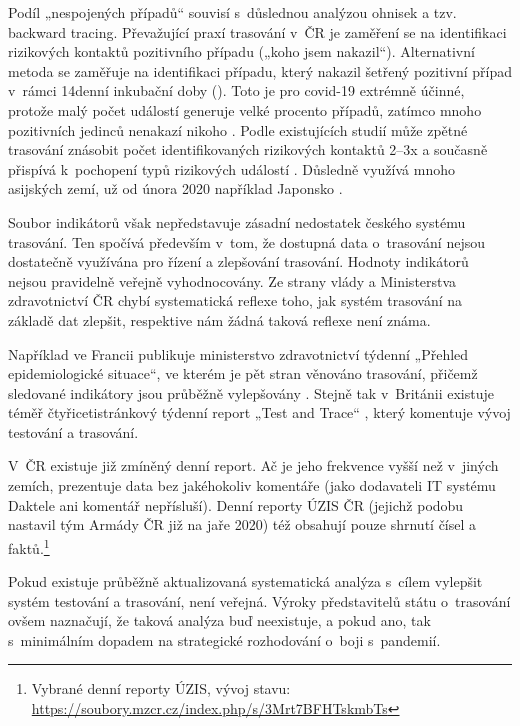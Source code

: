 Podíl „nespojených případů“ souvisí s~důslednou analýzou ohnisek a tzv. back\-ward tracing. Převažující praxí trasování v~ČR je zaměření se na identifikaci rizikových kontaktů pozitivního případu („koho jsem nakazil“). Alternativní metoda se zaměřuje na identifikaci případu, který nakazil šetřený pozitivní případ v~rámci 14denní inkubační doby (). Toto  je pro covid-19 extrémně účinné, protože malý počet  událostí generuje velké procento případů, zatímco mnoho pozitivních jedinců nenakazí nikoho \cite{tr_adam_clustering_2020}. Podle existujících studií může zpětné trasování znásobit počet identifikovaných rizikových kontaktů 2--3x a současně přispívá k~pochopení typů rizikových událostí \cite{tr_Endo}. Důsledně  využívá mnoho asijských zemí, už od února 2020 například Japonsko \cite{tr_Loh}.

Soubor indikátorů však nepředstavuje zásadní nedostatek českého systému trasování. Ten spočívá především v~tom, že dostupná data o~trasování nejsou dostatečně využívána pro řízení a zlepšování trasování. Hodnoty indikátorů nejsou pravidelně veřejně vyhodnocovány. Ze strany vlády a Ministerstva zdravotnictví ČR chybí systematická reflexe toho, jak systém trasování na základě dat zlepšit, respektive nám žádná taková reflexe není známa.

Například ve Francii publikuje ministerstvo zdravotnictví týdenní „Přehled epidemiologické situace“, ve kterém je pět stran věnováno trasování, přičemž sledované indikátory jsou průběžně vylepšovány \cite{tr_france}. Stejně tak v~Británii existuje téměř čtyřicetistránkový týdenní report „Test and Trace“ \cite{tr_gov_uk}, který komentuje vývoj testování a trasování.

V~ČR existuje již zmíněný denní report. Ač je jeho frekvence vyšší než v~jiných zemích, prezentuje data bez jakéhokoliv komentáře (jako dodavateli IT systému Daktele ani komentář nepřísluší). Denní reporty ÚZIS ČR (jejichž podobu nastavil tým Armády ČR již na jaře 2020) též obsahují pouze shrnutí čísel a faktů.\footnote{Vybrané denní reporty ÚZIS, vývoj stavu: \url{https://soubory.mzcr.cz/index.php/s/3Mrt7BFHTskmbTs}}

Pokud existuje průběžně aktualizovaná systematická analýza s~cílem vylepšit systém testování a trasování, není veřejná. Výroky představitelů státu o~trasování ovšem naznačují, že taková analýza buď neexistuje, a pokud ano, tak s~minimálním dopadem na strategické rozhodování o~boji s~pandemií.

